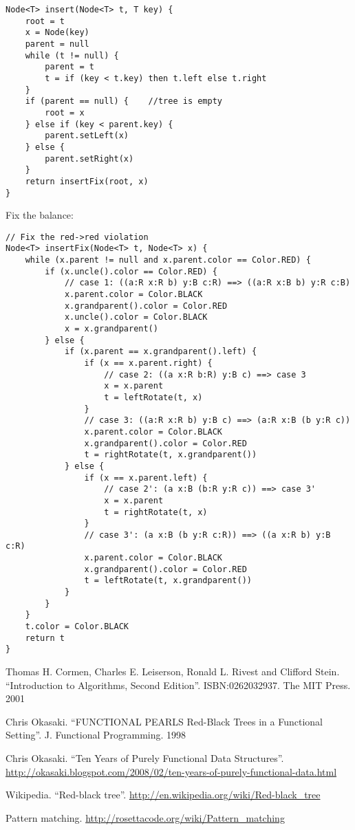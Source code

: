 \documentclass[b5paper]{article}
\begin{document}
\begin{lstlisting}[language = Bourbaki]
Node<T> insert(Node<T> t, T key) {
    root = t
    x = Node(key)
    parent = null
    while (t != null) {
        parent = t
        t = if (key < t.key) then t.left else t.right
    }
    if (parent == null) {    //tree is empty
        root = x
    } else if (key < parent.key) {
        parent.setLeft(x)
    } else {
        parent.setRight(x)
    }
    return insertFix(root, x)
}
\end{lstlisting}

Fix the balance:

\begin{lstlisting}[language = Bourbaki]
// Fix the red->red violation
Node<T> insertFix(Node<T> t, Node<T> x) {
    while (x.parent != null and x.parent.color == Color.RED) {
        if (x.uncle().color == Color.RED) {
            // case 1: ((a:R x:R b) y:B c:R) ==> ((a:R x:B b) y:R c:B)
            x.parent.color = Color.BLACK
            x.grandparent().color = Color.RED
            x.uncle().color = Color.BLACK
            x = x.grandparent()
        } else {
            if (x.parent == x.grandparent().left) {
                if (x == x.parent.right) {
                    // case 2: ((a x:R b:R) y:B c) ==> case 3
                    x = x.parent
                    t = leftRotate(t, x)
                }
                // case 3: ((a:R x:R b) y:B c) ==> (a:R x:B (b y:R c))
                x.parent.color = Color.BLACK
                x.grandparent().color = Color.RED
                t = rightRotate(t, x.grandparent())
            } else {
                if (x == x.parent.left) {
                    // case 2': (a x:B (b:R y:R c)) ==> case 3'
                    x = x.parent
                    t = rightRotate(t, x)
                }
                // case 3': (a x:B (b y:R c:R)) ==> ((a x:R b) y:B c:R)
                x.parent.color = Color.BLACK
                x.grandparent().color = Color.RED
                t = leftRotate(t, x.grandparent())
            }
        }
    }
    t.color = Color.BLACK
    return t
}
\end{lstlisting}

\ifx\wholebook\relax \else
\begin{thebibliography}{99}

Thomas H. Cormen, Charles E. Leiserson, Ronald L. Rivest and Clifford Stein.
``Introduction to Algorithms, Second Edition''. ISBN:0262032937. The MIT Press. 2001

Chris Okasaki. ``FUNCTIONAL PEARLS Red-Black Trees in a Functional Setting''. J. Functional Programming. 1998

Chris Okasaki. ``Ten Years of Purely Functional Data Structures''. \url{http://okasaki.blogspot.com/2008/02/ten-years-of-purely-functional-data.html}

Wikipedia. ``Red-black tree''. \url{http://en.wikipedia.org/wiki/Red-black\_tree}

Pattern matching. \url{http://rosettacode.org/wiki/Pattern\_matching}

\end{thebibliography}

\expandafter\enddocument
\fi
\end{document}
